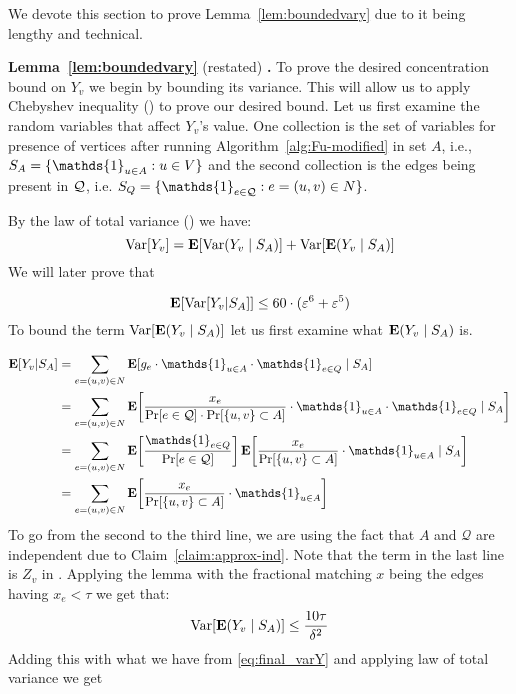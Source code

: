 \documentclass[letterpaper,11pt]{article}
\renewcommand{\epsilon}{\varepsilon}
\DeclareMathOperator{\E}{\ensuremath{\normalfont \textbf{E}}}
\newcommand{\mc}[1]{\ensuremath{\mathcal{#1}}}
\DeclareMathOperator{\var}{Var}
\renewcommand{\epsilon}[0]{\ensuremath{\varepsilon}}
\let\originalleft\left
\let\originalright\right
\renewcommand{\left}{\mathopen{}\mathclose\bgroup\originalleft}
\renewcommand{\right}{\aftergroup\egroup\originalright}
\renewcommand{\mc}[1]{\ensuremath{\mathcal{#1}}}
\newcommand{\restatelem}[2]{\noindent \textbf{Lemma~#1} (restated) \textbf{.} {\em #2}}
\begin{document}
We devote this section to prove Lemma~\ref{lem:boundedvary} due to it being lengthy and technical. 





\restatelem{\ref{lem:boundedvary}}{\lemboundedy{}}
To prove the desired concentration bound on $Y_v$ we begin by bounding its variance. This will allow us to apply Chebyshev inequality () to prove our desired bound. Let us first examine the random variables that affect $Y_v$'s value.
One collection is the set of variables for presence of vertices after running Algorithm~\ref{alg:Fu-modified} in set $A$, i.e., $\rva = \{\mathds{1}_{u \in A} :  u\in V  \} $ and the second collection is the edges being present in $\mathcal{Q}$, i.e. $\rvq = \{\mathds{1}_{e \in \qstar} : e = (u, v) \in N \}$. 

By the law of total variance () we have: 
$$\var[Y_v] = \E[\var(Y_v\mid S_A)] + \var[\E(Y_v \mid S_A)]$$
We will later prove that 

\begin{equation}\label{eq:final_varY}
\E[\var[Y_v | S_A]] \leq 60 \cdot (\epsilon^{6} + \epsilon^{5})
\end{equation}
To bound the term $\var[\E(Y_v\mid S_A)]$ let us first examine what $\E(Y_v\mid S_A)$ is. 

\begin{align*}
\E[Y_v|S_A] & = \sum_{e = (u, v) \in N} \E[g_e \cdot \mathds{1}_{u \in A} \cdot \mathds{1}_{e \in Q} \mid S_A] \\ & = \sum_{e = (u, v) \in N} \E\left[\frac{x_e}{\Pr[e \in \mathcal{Q}] \cdot \Pr[\{u, v\} \subset A]} \cdot \mathds{1}_{u \in A} \cdot \mathds{1}_{e \in Q} \mid S_A\right] \\
& = \sum_{e = (u, v) \in N} \E\left[\frac{\mathds{1}_{e \in Q}}{\Pr[e \in \mathcal{Q}]}\right] \E\left[\frac{x_e}{\Pr[\{u, v\} \subset A]} \cdot \mathds{1}_{u \in A} \mid S_A\right] \\
& = \sum_{e = (u, v) \in N} \E\left[\frac{x_e}{\Pr[\{u, v\} \subset A]} \cdot \mathds{1}_{u \in A}\right]
\end{align*}
To go from the second to the third line, we are using the fact that $A$ and $\mc{Q}$ are independent due to Claim~\ref{claim:approx-ind}.
Note that the term in the last line is $Z_v$ in .
Applying  the lemma with the fractional matching $x$ being the edges having $x_e < \tau$ we get that: 
$$\var[\E(Y_v\mid S_A)] \leq \frac{10\tau}{\delta^2}$$
Adding this with what we have from \cref{eq:final_varY} and applying law of total variance we get
\end{document}

